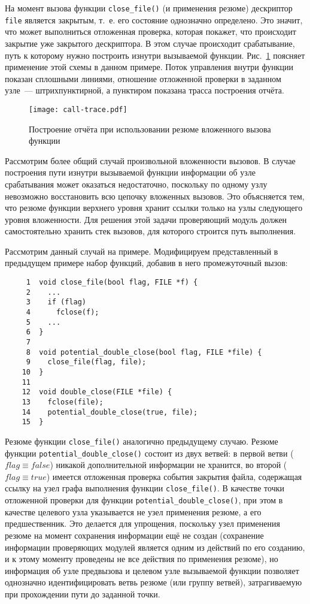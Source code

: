 На момент вызова функции \texttt{close\_file()} (и применения резюме) дескриптор \texttt{file} является закрытым, т.~е. его состояние однозначно определено. Это значит, что может выполниться отложенная проверка, которая покажет, что происходит закрытие уже закрытого дескриптора. В этом случае происходит срабатывание, путь к которому нужно построить изнутри вызываемой функции. Рис.~\ref{pic:call-trace} поясняет применение этой схемы в данном примере. Поток управления внутри функции показан сплошными линиями, отношение отложенной проверки в заданном узле~--- штрихпунктирной, а пунктиром показана трасса построения отчёта.

\begin{figure}
   \centering
   \texttt{[image: call-trace.pdf]}
   \caption{Построение отчёта при использовании резюме вложенного вызова функции}\label{pic:call-trace}
\end{figure}


Рассмотрим более общий случай произвольной вложенности вызовов. В случае построения пути изнутри вызываемой функции информации об узле срабатывания может оказаться недостаточно, поскольку по одному узлу невозможно восстановить всю цепочку вложенных вызовов. Это объясняется тем, что резюме функции верхнего уровня хранит ссылки только на узлы следующего уровня вложенности. Для решения этой задачи проверяющий модуль должен самостоятельно хранить стек вызовов, для которого строится путь выполнения.

Рассмотрим данный случай на примере. Модифицируем представленный в предыдущем примере набор функций, добавив в него промежуточный вызов:

\begin{verbatim}
     1  void close_file(bool flag, FILE *f) {
     2    ...
     3    if (flag)
     4      fclose(f);
     5    ...
     6  }
     7
     8  void potential_double_close(bool flag, FILE *file) {
     9    close_file(flag, file);
    10  }
    11
    12  void double_close(FILE *file) {
    13    fclose(file);
    14    potential_double_close(true, file);
    15  }
\end{verbatim}

Резюме функции \texttt{close\_file()} аналогично предыдущему случаю. Резюме функции \texttt{potential\_double\_close()} состоит из двух ветвей: в первой ветви ($flag \equiv false$) никакой дополнительной информации не хранится, во второй ($flag \equiv true$) имеется отложенная проверка события закрытия файла, содержащая ссылку на узел  графа выполнения функции \texttt{close\_file()}. В качестве точки отложенной проверки для функции \texttt{potential\_double\_close()}, при этом в качестве целевого узла указывается не узел применения резюме, а его предшественник. Это делается для упрощения, поскольку узел применения резюме на момент сохранения информации ещё не создан (сохранение информации проверяющих модулей является одним из действий по его созданию, и к этому моменту проведены не все действия по применения резюме), но информация об узле предвызова и целевом узле вызываемой функции позволяет однозначно идентифицировать ветвь резюме (или группу ветвей), затрагиваемую при прохождении пути до заданной точки.

